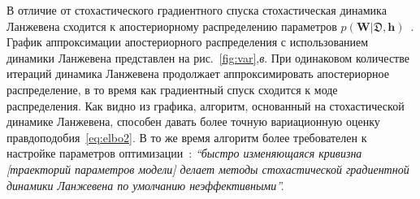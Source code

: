 В отличие от стохастического градиентного спуска стохастическая динамика Ланжевена сходится к апостериорному распределению параметров $p(\mathbf{W}|\mathfrak{D},\mathbf{h})$~\cite{langevin, langevin_sato}.  График аппроксимации апостериорного распределения с использованием динамики Ланжевена представлен на рис.~\ref{fig:var},\textit{в}. При одинаковом количестве итераций динамика Ланжевена продолжает аппроксимировать апостериорное распределение, в то время как градиентный спуск сходится к моде распределения. {Как видно из графика, алгоритм, основанный на стохастической динамике Ланжевена, способен давать более точную вариационную оценку правдоподобия~\eqref{eq:elbo2}. В то же время алгоритм более требователен к настройке параметров оптимизации~\cite{lang_cond}: \textit{``быстро изменяющаяся кривизна [траекторий параметров модели] делает методы стохастической градиентной динамики Ланжевена по умолчанию неэффективными''.}}

